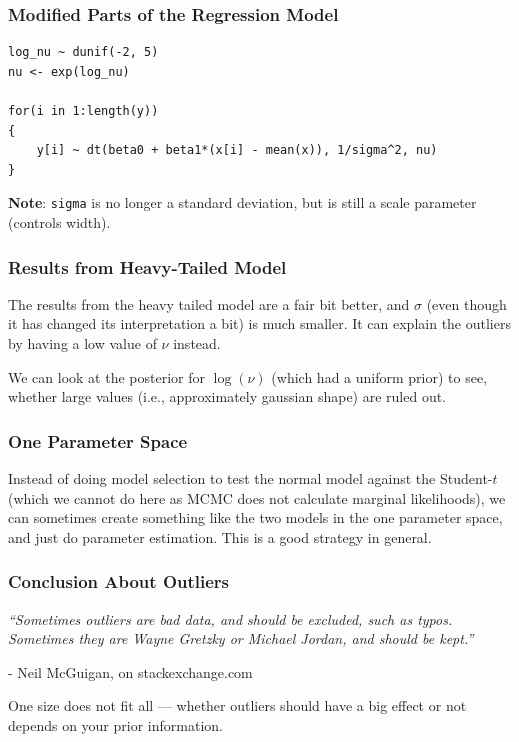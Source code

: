 \documentclass{beamer}
\begin{document}
\begin{frame}[fragile]
\frametitle{Modified Parts of the Regression Model}
\footnotesize
\begin{verbatim}
log_nu ~ dunif(-2, 5)
nu <- exp(log_nu)

for(i in 1:length(y))
{
    y[i] ~ dt(beta0 + beta1*(x[i] - mean(x)), 1/sigma^2, nu)
}
\end{verbatim}
\pause

{\bf Note}: \texttt{sigma} is no longer a standard deviation, but is still
a scale parameter (controls width).

\end{frame}


\begin{frame}[fragile]
\frametitle{Results from Heavy-Tailed Model}
The results from the heavy tailed model are a fair bit better,
and $\sigma$ (even though it has changed its interpretation a bit)
is much smaller. It can explain the outliers by having a low value
of $\nu$ instead.\\[0.5em]\pause

We can look at the posterior for $\log(\nu)$ (which had a uniform prior)
to see, whether large values (i.e., approximately gaussian shape) are ruled out.

\end{frame}

\begin{frame}[fragile]
\frametitle{One Parameter Space}
Instead of doing model selection to test the
normal model against the Student-$t$
(which we cannot do here as MCMC does not
calculate marginal likelihoods), we can sometimes create something like
the two models in the one parameter space, and just do parameter estimation.
This is a good strategy in general.

\end{frame}


\begin{frame}
\frametitle{Conclusion About Outliers}

{\em
``Sometimes outliers are bad data, and should be excluded,
such as typos. Sometimes they are Wayne Gretzky or
Michael Jordan, and should be kept.''}

- Neil McGuigan, on stackexchange.com\\[1em]

\pause

One size does not fit all --- whether outliers should have a big effect
or not depends on your prior information.

\end{frame}
\end{document}
